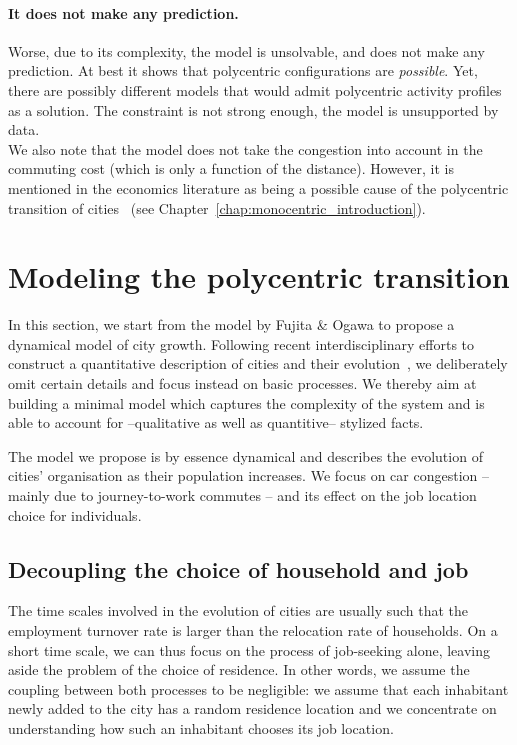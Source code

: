 \paragraph{It does not make any prediction.} Worse, due to its complexity, the
model is unsolvable, and does not make any prediction. At best it shows that
polycentric configurations are \emph{possible}. Yet, there are possibly
different models that would admit polycentric activity profiles as a solution.
The constraint is not strong enough, the model is unsupported by data.\\ 

We also note that the model does not take the congestion into account in the
commuting cost (which is only a function of the distance). However, it is
mentioned in the economics literature as being a possible cause of the
polycentric transition of cities~\cite{McMillen:2003} (see
Chapter~\ref{chap:monocentric_introduction}). 

\section{Modeling the polycentric transition}
\label{sec:an_out_of_equilibrium_model_}

In this section, we start from the model by Fujita \& Ogawa to propose a
dynamical model of city growth. Following recent interdisciplinary efforts to
construct a quantitative description of cities and their
evolution~\cite{Makse:1995,Zanette:1997,Marsili:1998,Bettencourt:2007,Batty:2008},
we deliberately omit certain details and focus instead on basic processes. We
thereby aim at building a minimal model which captures the complexity of the
system and is able to account for --qualitative as well as quantitive-- stylized
facts.  

The model we propose is by essence dynamical and describes the evolution
of cities' organisation as their population increases. We focus on car
congestion -- mainly due to journey-to-work commutes -- and its effect on the
job location choice for individuals.\\

\subsection{Decoupling the choice of household and job}
\label{sub:decoupling_the_choice_of_household_and_job}

The time scales involved in the evolution of cities are usually such that the
employment turnover rate is larger than the relocation rate of households. On a
short time scale, we can thus focus on the process of job-seeking alone, leaving
aside the problem of the choice of residence. In other words, we assume the
coupling between both processes to be negligible: we assume that each inhabitant
newly added to the city has a random residence location and we concentrate on
understanding how such an inhabitant chooses its job location.\\

